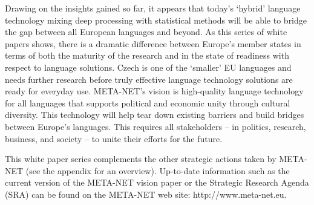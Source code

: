 \begin{multicols}{2}

Drawing on the insights gained so far, it appears that today’s ‘hybrid’ language technology mixing deep processing with statistical methods will be able to bridge the gap between all European languages and beyond. As this series of white papers shows, there is a dramatic difference between Europe’s member states in terms of both the maturity of the research and in the state of readiness with respect to language solutions. Czech is one of the ‘smaller’ EU languages and needs further research before truly effective language technology solutions are ready for everyday use.
META-NET’s vision is high-quality language technology for all languages that supports political and economic unity through cultural diversity. This technology will help tear down existing barriers and build bridges between Europe’s languages. This requires all stakeholders -- in politics, research, business, and society -- to unite their efforts for the future.

This white paper series complements the other strategic actions taken by META-NET (see the appendix for an overview). Up-to-date information such as the current version of the META-NET vision paper \cite{Meta1} or the Strategic Research Agenda (SRA) can be found on the META-NET web site: http://www.meta-net.eu.
\end{multicols}
\clearpage

